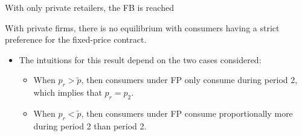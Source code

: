 \documentclass{class}
\begin{document}
\begin{frame}{With only private retailers, the FB is reached}\label{PrivateFirms2}


\begin{lemma}
 With private firms, there is no equilibrium with consumers having a strict preference for the fixed-price contract. 
\end{lemma}

\vfill

\begin{itemize}


\item The intuitions for this result depend on the two cases considered:
\vfill
\begin{itemize}
\item When $p_r > \tilde{p}$, then consumers under FP only consume during period 2, which implies that $p_r = p_2$. $\quad$ \hyperlink{qtt_elec2}{}
\vfill
\item When $p_r < \tilde{p}$, then consumers under FP consume proportionally more during period 2 than period 2. $\quad$ \hyperlink{qtt_elec2}{}
\vfill

\end{itemize}
\end{itemize}

\end{frame}

\end{document}
